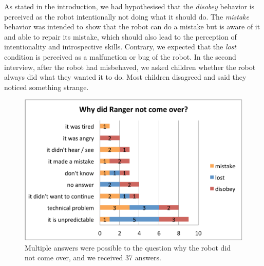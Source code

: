 \documentclass[letterpaper, 10pt, conference]{ieeeconf}
\begin{document}
As stated in the introduction, we had hypothesised that the \textit{disobey}
behavior is perceived as the robot intentionally not doing what it should do.
The \textit{mistake} behavior was intended to show that the robot can do a
mistake but is aware of it and able to repair its mistake, which should also
lead to the perception of intentionality and introspective skills.  Contrary, we expected that the
\textit{lost} condition is perceived as a malfunction or bug of the robot.  In
the second interview, after the robot had misbehaved, we asked children whether
the robot always did what they wanted it to do. Most children disagreed and said
they noticed something strange.

\begin{figure}[!h]
    \centering
    \includegraphics[width=0.8\linewidth]{domino-why-misbehavior.pdf}   
    \caption[Why Did the Robot Misbehave?]{\small Multiple answers were possible
    to the question why the robot did not come over, and we received 37 answers.}

    \label{fig:domino-why-misbehavior}
\end{figure}	
\end{document}
